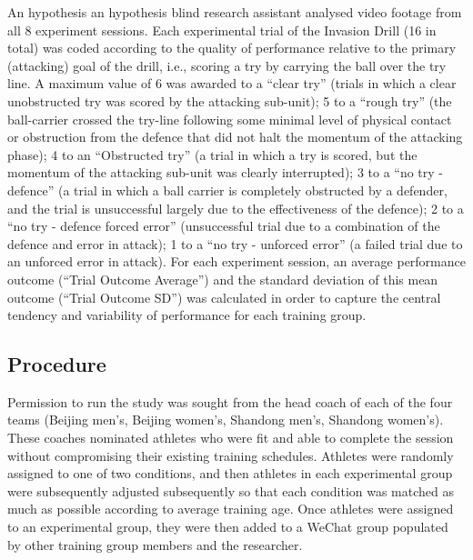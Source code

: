 An hypothesis an hypothesis blind research assistant analysed video footage from all 8 experiment sessions.  Each experimental trial of the Invasion Drill (16 in total) was coded according to the quality of performance relative to the primary (attacking) goal of the drill, i.e., scoring a try by carrying the ball over the try line.  A maximum value of 6 was awarded to a ``clear try'' (trials in which a clear unobstructed try was scored by the attacking sub-unit); 5 to a ``rough try'' (the ball-carrier crossed the try-line following some minimal level of physical contact or obstruction from the defence that did not halt the momentum of the attacking phase); 4 to an ``Obstructed try'' (a trial in which a try is scored, but the momentum of the attacking sub-unit was clearly interrupted); 3 to a ``no try - defence''  (a trial in which a ball carrier is completely obstructed by a defender, and the trial is unsuccessful largely due to the effectiveness of the defence); 2 to a ``no try - defence forced error'' (unsuccessful trial due to a combination of the defence and error in attack); 1 to a ``no try - unforced error'' (a failed trial due to an unforced error in attack).  For each experiment session, an average performance outcome (``Trial Outcome Average'') and the standard deviation of this mean outcome (``Trial Outcome SD'') was calculated in order to capture the central tendency and variability of performance for each training group.


\subsection{Procedure}
Permission to run the study was sought from the head coach of each of the four teams (Beijing men's, Beijing women's, Shandong men's, Shandong women's).  These coaches nominated athletes who were fit and able to complete the session without compromising their existing training schedules.  Athletes were randomly assigned to one of two conditions, and then athletes in each experimental group were subsequently adjusted subsequently so that each condition was matched as much as possible according to average training age. Once athletes were assigned to an experimental group, they were then added to a WeChat group populated by other training group members and the researcher.

